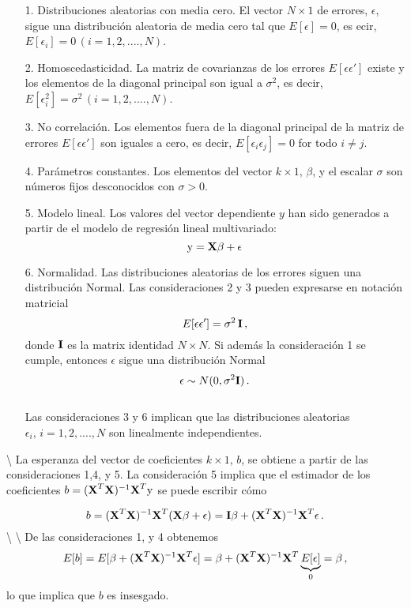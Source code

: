 \documentclass[
]{agujournal2019}
\begin{document}
\begin{itemize}
\item[1.]Distribuciones aleatorias con media cero. El vector
$N\times1$ de errores, $\epsilon$, sigue una distribución aleatoria de
media cero tal que $E[\epsilon]=0$, es ecir, $E[\epsilon_i]=
0\,(i=1,2,....,N)$.
\item[2.]Homoscedasticidad. La matriz de covarianzas de los errores
$E[\epsilon \epsilon']$ existe y los elementos de la diagonal
principal son igual a $\sigma^2$, es decir,
$E[\epsilon^2_i]=\sigma^2\,(i=1,2,....,N)$.
\item[3.]No correlación. Los elementos fuera de la diagonal principal
de la matriz de errores $E[\epsilon \epsilon']$ son iguales a cero,
es decir, $E[\epsilon_i\epsilon_j]=0$ for todo $i\neq j$.
\item[4.]Parámetros constantes. Los elementos del vector $k\times1$,
$\beta$, y el escalar $\sigma$ son números fijos desconocidos con
$\sigma>0$.
\item[5.]Modelo lineal. Los valores del vector dependiente $y$ han sido
generados a partir de el modelo de regresión lineal multivariado:
$${\rm y}={\textbf X}\beta + \epsilon$$
\item[6.]Normalidad. Las distribuciones aleatorias de los errores siguen
una distribución Normal. Las consideraciones 2 y 3 pueden expresarse en
notación matricial
$$E[\epsilon \epsilon']=\sigma^2\,{\textbf I}\,,$$
donde ${\textbf I}$ es la matrix identidad $N\times N$. Si además la
consideración 1 se cumple, entonces $\epsilon$ sigue una distribución Normal
$$\epsilon\sim N(0,\sigma^2{\textbf I})\,.$$
\\
\noindent Las consideraciones 3 y 6 implican que las distribuciones aleatorias $\epsilon_i,\,
i=1,2,....,N$ son linealmente independientes.
\end{itemize}

\vspace{0.5cm}

 \textbackslash{}
\noindent La esperanza del vector de coeficientes \(k\times 1\), \(b\),
se obtiene a partir de las consideraciones 1,4, y 5. La consideración 5
implica que el estimador de los coeficientes
\(b=({\textbf X}^T{\textbf X})^{-1}{\textbf X}^T {\rm y}\) se puede
escribir cómo

\[b=({\textbf X}^T{\textbf X})^{-1}{\textbf X}^T({\textbf X} \beta + \epsilon)={\textbf I}\beta +
    ({\textbf X}^T{\textbf X})^{-1}{\textbf X}^T \epsilon\,.\]
\textbackslash{} \textbackslash{} \noindent De las consideraciones 1, y
4 obtenemos
\[E[b]=E[\beta + ({\textbf X}^T{\textbf X})^{-1}{\textbf X}^T\epsilon]=
  \beta + ({\textbf X}^T{\textbf X})^{-1}{\textbf X}^T \underbrace{E[\epsilon]}_{0}=\beta\,,\]
lo que implica que \(b\) es insesgado.
\end{document}
